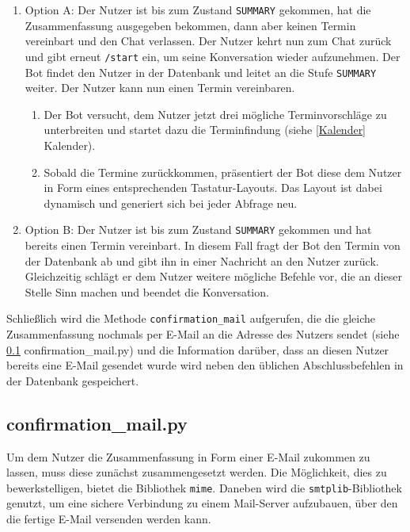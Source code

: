                 \begin{enumerate}
                
                    \item Option A:  Der Nutzer ist bis zum Zustand \verb|SUMMARY| gekommen, hat die Zusammenfassung ausgegeben bekommen, dann aber keinen Termin vereinbart und den Chat verlassen. Der Nutzer kehrt nun zum Chat zurück und gibt erneut \verb|/start| ein, um seine Konversation wieder aufzunehmen. Der Bot findet den Nutzer in der Datenbank und leitet an die Stufe \verb|SUMMARY| weiter. Der Nutzer kann nun einen Termin vereinbaren. \\
                    
                    \begin{enumerate}
                        \item Der Bot versucht, dem Nutzer jetzt drei mögliche Terminvorschläge zu unterbreiten und startet dazu die Terminfindung (siehe \ref{Kalender} Kalender).
                        \item Sobald die Termine zurückkommen, präsentiert der Bot diese dem Nutzer in Form eines entsprechenden Tastatur-Layouts. Das Layout ist dabei dynamisch und generiert sich bei jeder Abfrage neu.
                    \end{enumerate}
                
                    \item Option B: Der Nutzer ist bis zum Zustand \verb|SUMMARY| gekommen und hat bereits einen Termin vereinbart. In diesem Fall fragt der Bot den Termin von der Datenbank ab und gibt ihn in einer Nachricht an den Nutzer zurück. Gleichzeitig schlägt er dem Nutzer weitere mögliche Befehle vor, die an dieser Stelle Sinn machen und beendet die Konversation.
                
                \end{enumerate}

            Schließlich wird die Methode \verb|confirmation_mail| aufgerufen, die die gleiche Zusammenfassung nochmals per E-Mail an die Adresse des Nutzers sendet (siehe \ref{confirmation_mail.py} confirmation\_mail.py) und die Information darüber, dass an diesen Nutzer bereits eine E-Mail gesendet wurde wird neben den üblichen Abschlussbefehlen in der Datenbank gespeichert.

                    
        \subsection{confirmation\_mail.py} \label{confirmation_mail.py}
                Um dem Nutzer die Zusammenfassung in Form einer E-Mail zukommen zu lassen, muss diese zunächst zusammengesetzt werden. Die Möglichkeit, dies zu bewerkstelligen, bietet die Bibliothek \verb|mime|. \cite{email.mime} Daneben wird die \verb|smtplib|-Bibliothek genutzt, um eine sichere Verbindung zu einem Mail-Server aufzubauen, über den die fertige E-Mail versenden werden kann. \cite{smtplib}\\

